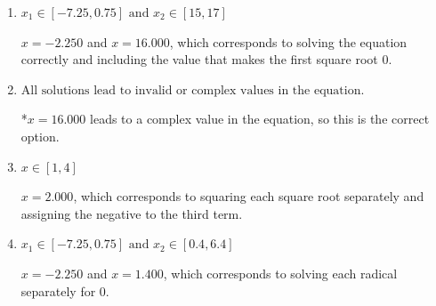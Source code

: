 \documentclass{extbook}[14pt]
\begin{document}
\begin{enumerate}
{\begin{enumerate}[label=\Alph*.]
This corresponds to not checking that the potential solution $x = 16.000$ leads to a complex value in the original equation.
\item \( x_1 \in [-7.25, 0.75] \text{ and } x_2 \in [15,17] \)

$x = -2.250$ and $x = 16.000$, which corresponds to solving the equation correctly and including the value that makes the first square root 0.
\item \( \text{All solutions lead to invalid or complex values in the equation.} \)

*$x = 16.000$ leads to a complex value in the equation, so this is the correct option.
\item \( x \in [1,4] \)

$x = 2.000$, which corresponds to squaring each square root separately and assigning the negative to the third term.
\item \( x_1 \in [-7.25, 0.75] \text{ and } x_2 \in [0.4,6.4] \)

$x = -2.250$ and $x = 1.400$, which corresponds to solving each radical separately for 0.
\end{enumerate}

}
\end{enumerate}
\end{document}
